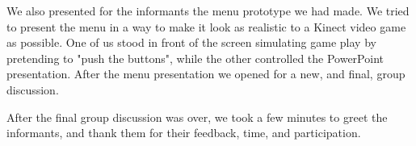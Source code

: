 We also presented for the informants the menu prototype we had made. We tried to present the menu in a way to make it look as realistic to a Kinect video game as possible. One of us stood in front of the screen simulating game play by pretending to "push the buttons", while the other controlled the PowerPoint presentation.  After the menu presentation we opened for a new, and final, group discussion. 

After the final group discussion was over, we took a few minutes to greet the informants, and thank them for their feedback, time, and participation.
 

